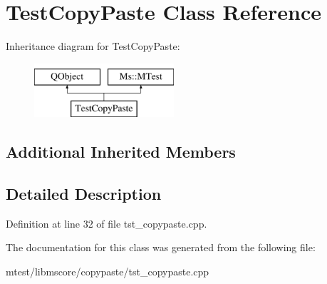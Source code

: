 \hypertarget{class_test_copy_paste}{}\section{Test\+Copy\+Paste Class Reference}
\label{class_test_copy_paste}
Inheritance diagram for Test\+Copy\+Paste\+:\begin{figure}[H]
\begin{center}
\leavevmode
\includegraphics[height=2.000000cm]{class_test_copy_paste}
\end{center}
\end{figure}
\subsection*{Additional Inherited Members}


\subsection{Detailed Description}


Definition at line 32 of file tst\+\_\+copypaste.\+cpp.



The documentation for this class was generated from the following file\+:\begin{DoxyCompactItemize}
\item 
mtest/libmscore/copypaste/tst\+\_\+copypaste.\+cpp\end{DoxyCompactItemize}
